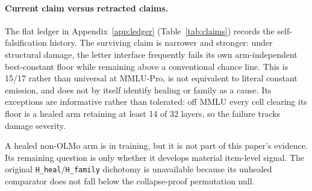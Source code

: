 \paragraph{Current claim versus retracted claims.}
The flat ledger in Appendix~\ref{app:ledger} (Table~\ref{tab:claims}) records the self-falsification history. The surviving claim is narrower and stronger: under structural damage, the letter interface frequently fails its own arm-independent best-constant floor while remaining above a conventional chance line. This is 15/17 rather than universal at MMLU-Pro, is not equivalent to literal constant emission, and does not by itself identify healing or family as a cause. Its exceptions are informative rather than tolerated: off MMLU every cell clearing its floor is a healed arm retaining at least 14 of 32 layers, so the failure tracks damage severity.

A healed non-OLMo arm is in training, but it is not part of this paper's evidence. Its remaining question is only whether it develops material item-level signal. The original \texttt{H\_heal}/\texttt{H\_family} dichotomy is unavailable because its unhealed comparator does not fall below the collapse-proof permutation null.
